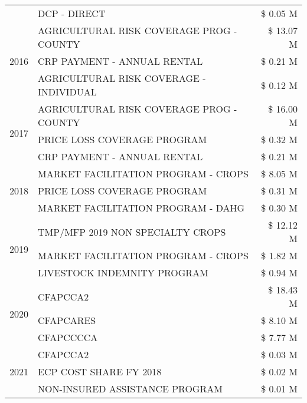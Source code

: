 \begin{tabular}{llr}
 & DCP - DIRECT & \$ 0.05 M \\
\cline{1-3}
\multirow[t]{3}{*}{2016} & AGRICULTURAL RISK COVERAGE PROG - COUNTY & \$ 13.07 M \\
 & CRP PAYMENT - ANNUAL RENTAL & \$ 0.21 M \\
 & AGRICULTURAL RISK COVERAGE - INDIVIDUAL & \$ 0.12 M \\
\cline{1-3}
\multirow[t]{3}{*}{2017} & AGRICULTURAL RISK COVERAGE PROG - COUNTY & \$ 16.00 M \\
 & PRICE LOSS COVERAGE PROGRAM & \$ 0.32 M \\
 & CRP PAYMENT - ANNUAL RENTAL & \$ 0.21 M \\
\cline{1-3}
\multirow[t]{3}{*}{2018} & MARKET FACILITATION PROGRAM - CROPS & \$ 8.05 M \\
 & PRICE LOSS COVERAGE PROGRAM & \$ 0.31 M \\
 & MARKET FACILITATION PROGRAM - DAHG & \$ 0.30 M \\
\cline{1-3}
\multirow[t]{3}{*}{2019} & TMP/MFP 2019 NON SPECIALTY CROPS & \$ 12.12 M \\
 & MARKET FACILITATION PROGRAM - CROPS & \$ 1.82 M \\
 & LIVESTOCK INDEMNITY PROGRAM & \$ 0.94 M \\
\cline{1-3}
\multirow[t]{3}{*}{2020} & CFAPCCA2 & \$ 18.43 M \\
 & CFAPCARES & \$ 8.10 M \\
 & CFAPCCCCA & \$ 7.77 M \\
\cline{1-3}
\multirow[t]{3}{*}{2021} & CFAPCCA2 & \$ 0.03 M \\
 & ECP COST SHARE FY 2018 & \$ 0.02 M \\
 & NON-INSURED ASSISTANCE PROGRAM & \$ 0.01 M \\
\cline{1-3}
\bottomrule
\end{tabular}
